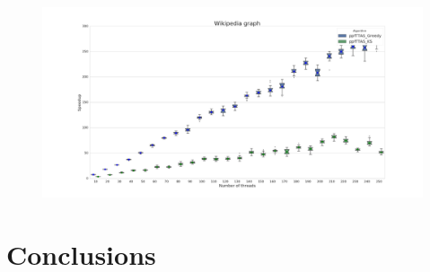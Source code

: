 \documentclass[letterpaper]{article}
\begin{document}
\begin{figure}
	\caption{}
	\label{fig:ksvsgreedy_s}
	\includegraphics[width=\textwidth]{../../plot/output/report/wikipedia_GREEDYvsKS.png}
\end{figure}

%

%

\section{Conclusions}
\end{document}
